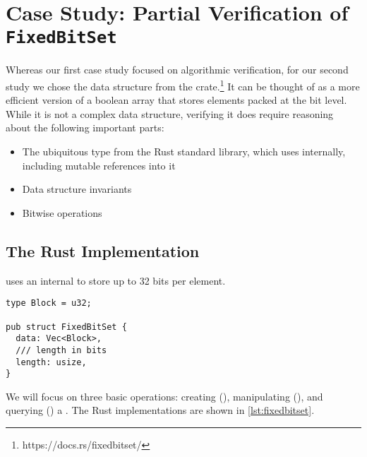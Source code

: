 \section{Case Study: Partial Verification of \texttt{FixedBitSet}}
\label{sec:fixedbitset}

Whereas our first case study focused on algorithmic verification, for our second
study we chose the  data structure from the 
crate.\footnote{https://docs.rs/fixedbitset/} It can be thought of as
a more efficient version of a boolean array that stores elements packed at the bit
level. While it is not a complex data structure, verifying it does require
reasoning about the following important parts:

\begin{itemize}
  \item The ubiquitous  type from the Rust standard library, which
     uses internally, including mutable references into it
  \item Data structure invariants
  \item Bitwise operations
\end{itemize}

\subsection{The Rust Implementation}

 uses an internal  to store up to 32 bits per element.

\begin{verbatim}
type Block = u32;

pub struct FixedBitSet {
  data: Vec<Block>,
  /// length in bits
  length: usize,
}
\end{verbatim}

We will focus on three basic operations: creating (),
manipulating (), and querying () a
. The Rust implementations are shown in \autoref{lst:fixedbitset}.

